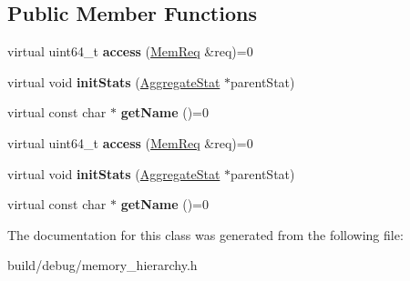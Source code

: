 \subsection*{Public Member Functions}
\begin{DoxyCompactItemize}
\item 
\hypertarget{classMemObject_aca4da1625a88f6bf6c3ec41c20a4a956}{virtual uint64\-\_\-t {\bfseries access} (\hyperlink{structMemReq}{Mem\-Req} \&req)=0}\label{classMemObject_aca4da1625a88f6bf6c3ec41c20a4a956}

\item 
\hypertarget{classMemObject_a791d5b0060cfc96f2109949e2da87f12}{virtual void {\bfseries init\-Stats} (\hyperlink{classAggregateStat}{Aggregate\-Stat} $\ast$parent\-Stat)}\label{classMemObject_a791d5b0060cfc96f2109949e2da87f12}

\item 
\hypertarget{classMemObject_a56c0fb3a2f420c9c74b5dd3dc5b194b5}{virtual const char $\ast$ {\bfseries get\-Name} ()=0}\label{classMemObject_a56c0fb3a2f420c9c74b5dd3dc5b194b5}

\item 
\hypertarget{classMemObject_aca4da1625a88f6bf6c3ec41c20a4a956}{virtual uint64\-\_\-t {\bfseries access} (\hyperlink{structMemReq}{Mem\-Req} \&req)=0}\label{classMemObject_aca4da1625a88f6bf6c3ec41c20a4a956}

\item 
\hypertarget{classMemObject_a791d5b0060cfc96f2109949e2da87f12}{virtual void {\bfseries init\-Stats} (\hyperlink{classAggregateStat}{Aggregate\-Stat} $\ast$parent\-Stat)}\label{classMemObject_a791d5b0060cfc96f2109949e2da87f12}

\item 
\hypertarget{classMemObject_a56c0fb3a2f420c9c74b5dd3dc5b194b5}{virtual const char $\ast$ {\bfseries get\-Name} ()=0}\label{classMemObject_a56c0fb3a2f420c9c74b5dd3dc5b194b5}

\end{DoxyCompactItemize}


The documentation for this class was generated from the following file\-:\begin{DoxyCompactItemize}
\item 
build/debug/memory\-\_\-hierarchy.\-h\end{DoxyCompactItemize}
